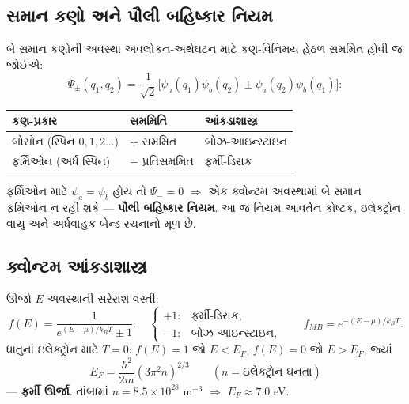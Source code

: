 \subsection{સમાન કણો અને પૌલી બહિષ્કાર નિયમ }
બે સમાન કણોની અવસ્થા અવલોકન-અર્થઘટન માટે કણ-વિનિમય હેઠળ સમમિત હોવી જ જોઈએ:
\[
\Psi_{\pm}(q_1,q_2)=\frac{1}{\sqrt2}\big[\psi_a(q_1)\psi_b(q_2)\pm\psi_a(q_2)\psi_b(q_1)\big]:
\]
\begin{center}
\begin{tabular}{@{}lll@{}}
\toprule
કણ-પ્રકાર & સમમિતિ & આંકડાશાસ્ત્ર \\
\midrule
બોસોન (સ્પિન $0,1,2\dots$) & $+$ સમમિત & બોઝ-આઇન્સ્ટાઇન \\
ફર્મિઓન (અર્ધ સ્પિન) & $-$ પ્રતિસમમિત & ફર્મી-ડિરાક \\
\bottomrule
\end{tabular}
\end{center}
ફર્મિઓન માટે $\psi_a=\psi_b$ હોય તો $\Psi_{-}=0$ $\Rightarrow$ એક ક્વોન્ટમ અવસ્થામાં બે સમાન ફર્મિઓન ન રહી શકે — \textbf{પૌલી બહિષ્કાર નિયમ}. આ જ નિયમ આવર્તન કોષ્ટક, ઇલેક્ટ્રોન વાયુ અને અર્ધવાહક બેન્ડ-રચનાનો મૂળ છે.

\subsection{ક્વોન્ટમ આંકડાશાસ્ત્ર }
ઊર્જા $E$ અવસ્થાની સરેરાશ વસ્તી:
\begin{equation}
f(E)=\frac{1}{e^{(E-\mu)/k_BT}\pm1}:\quad
\begin{cases}
+1:&\text{ફર્મી-ડિરાક},\\
-1:&\text{બોઝ-આઇન્સ્ટાઇન},
\end{cases}
\qquad
f_{MB}=e^{-(E-\mu)/k_BT}.
\label{eq:stats}
\end{equation}
ધાતુનાં ઇલેક્ટ્રોન માટે $T=0$: $f(E)=1$ જો $E<E_F$; $f(E)=0$ જો $E>E_F$, જ્યાં
\begin{equation}
E_F=\frac{\hbar^{2}}{2m}\left(3\pi^{2}n\right)^{2/3}
\qquad(n=\text{ઇલેક્ટ્રોન ઘનતા})
\label{eq:fermi}
\end{equation}
— \textbf{ફર્મી ઊર્જા}. તાંબામાં $n=8.5\times10^{28}$ m$^{-3}$ $\Rightarrow$ $E_F\approx7.0$ eV.

